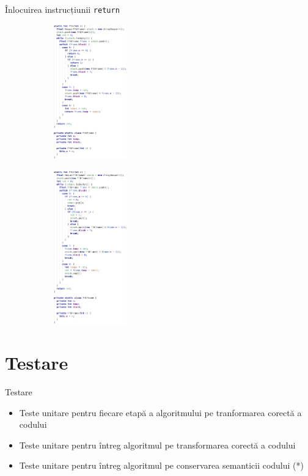 \documentclass{beamer}
\def\code#1{\texttt{#1}}
\begin{document}
\begin{frame}{Înlocuirea instrucțiunii \code{return}}
    \begin{figure}[htb]
        \begin{subfigure}[b]{.45\textwidth}
            \centering
            \includegraphics[height=2.3in]{../../../theses/diploma/src/img/inline-blocks-after-white-44.png}
        \end{subfigure}
        \begin{subfigure}[b]{.45\textwidth}
            \centering
            \includegraphics[height=2.617in]{../../../theses/diploma/src/img/replace-return-after-50.png}
        \end{subfigure}
    \end{figure}
\end{frame}

\section{Testare}

\begin{frame}{Testare}
    \begin{itemize}
        \item Teste unitare pentru fiecare etapă a algoritmului pe tranformarea corectă a codului
        \item Teste unitare pentru întreg algoritmul pe transformarea corectă a codului
        \item Teste unitare pentru întreg algoritmul pe conservarea semanticii codului (*)
    \end{itemize}
\end{frame}
	
\end{document}
